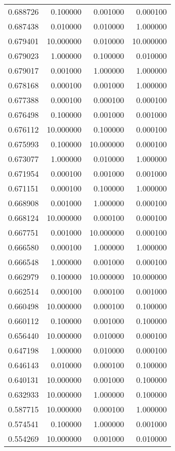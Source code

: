 \begin{tabular}{rrrr}
0.688726 & 0.100000 & 0.001000 & 0.000100 \\
0.687438 & 0.010000 & 0.010000 & 1.000000 \\
0.679401 & 10.000000 & 0.010000 & 10.000000 \\
0.679023 & 1.000000 & 0.100000 & 0.010000 \\
0.679017 & 0.001000 & 1.000000 & 1.000000 \\
0.678168 & 0.000100 & 0.001000 & 1.000000 \\
0.677388 & 0.000100 & 0.000100 & 0.000100 \\
0.676498 & 0.100000 & 0.001000 & 0.001000 \\
0.676112 & 10.000000 & 0.100000 & 0.000100 \\
0.675993 & 0.100000 & 10.000000 & 0.000100 \\
0.673077 & 1.000000 & 0.010000 & 1.000000 \\
0.671954 & 0.000100 & 0.001000 & 0.001000 \\
0.671151 & 0.000100 & 0.100000 & 1.000000 \\
0.668908 & 0.001000 & 1.000000 & 0.000100 \\
0.668124 & 10.000000 & 0.000100 & 0.000100 \\
0.667751 & 0.001000 & 10.000000 & 0.000100 \\
0.666580 & 0.000100 & 1.000000 & 1.000000 \\
0.666548 & 1.000000 & 0.001000 & 0.000100 \\
0.662979 & 0.100000 & 10.000000 & 10.000000 \\
0.662514 & 0.000100 & 0.000100 & 0.001000 \\
0.660498 & 10.000000 & 0.000100 & 0.100000 \\
0.660112 & 0.100000 & 0.001000 & 0.100000 \\
0.656440 & 10.000000 & 0.010000 & 0.000100 \\
0.647198 & 1.000000 & 0.010000 & 0.000100 \\
0.646143 & 0.010000 & 0.000100 & 0.100000 \\
0.640131 & 10.000000 & 0.001000 & 0.100000 \\
0.632933 & 10.000000 & 1.000000 & 0.100000 \\
0.587715 & 10.000000 & 0.000100 & 1.000000 \\
0.574541 & 0.100000 & 1.000000 & 0.001000 \\
0.554269 & 10.000000 & 0.001000 & 0.010000 \\
\bottomrule
\end{tabular}
